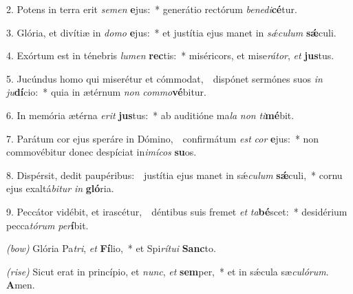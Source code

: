 2. Potens in terra erit \textit{se}\textit{men} \textbf{e}jus:~* generátio rectórum \textit{be}\textit{ne}\textit{di}\textbf{cé}tur.

3. Glória, et divítiæ in \textit{do}\textit{mo} \textbf{e}jus:~* et justítia ejus manet in \textit{s\'{\ae}}\textit{cu}\textit{lum} \textbf{s\'{\ae}}culi.

4. Exórtum est in ténebris \textit{lu}\textit{men} \textbf{rec}tis:~* miséricors, et mise\textit{rá}\textit{tor}, \textit{et} \textbf{jus}tus.

5. Jucúndus homo qui miserétur et cómmodat,~\GreDagger\ dispónet sermónes suos \textit{in} \textit{ju}\textbf{dí}cio:~* quia in ætérnum \textit{non} \textit{com}\textit{mo}\textbf{vé}bitur.

6. In memória ætérna \textit{e}\textit{rit} \textbf{jus}tus:~* ab auditióne ma\textit{la} \textit{non} \textit{ti}\textbf{mé}bit.

7. Parátum cor ejus speráre in Dómino,~\GreDagger\ confirmátum \textit{est} \textit{cor} \textbf{e}jus:~* non commovébitur donec despíciat in\textit{i}\textit{mí}\textit{cos} \textbf{su}os.

8. Dispérsit, dedit paupéribus:~\GreDagger\ justítia ejus manet in s\'{\ae}\textit{cu}\textit{lum} \textbf{s\'{\ae}}culi,~* cornu ejus exaltá\textit{bi}\textit{tur} \textit{in} \textbf{gló}ria.

9. Peccátor vidébit, et irascétur,~\GreDagger\ déntibus suis fremet \textit{et} \textit{ta}\textbf{bé}scet:~* desidérium pecca\textit{tó}\textit{rum} \textit{per}\textbf{í}bit.

\textit{(bow)} Glória Pa\textit{tri}, \textit{et} \textbf{Fí}lio,~* et Spi\textit{rí}\textit{tu}\textit{i} \textbf{Sanc}to.

\textit{(rise)} Sicut erat in princípio, et \textit{nunc}, \textit{et} \textbf{sem}per,~* et in s\'{\ae}cula sæ\textit{cu}\textit{ló}\textit{rum}. \textbf{A}men.